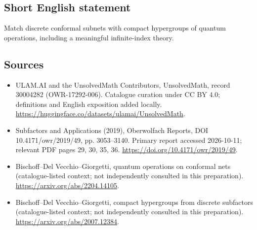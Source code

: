 \documentclass[11pt]{article}
\begin{document}
\subsection{Short English statement}
Match discrete conformal subnets with compact hypergroups of quantum operations, including a meaningful infinite-index theory.
\subsection{Sources}
\begin{itemize}
\item[\hypertarget{source:30004282:1}{S1}] ULAM.AI and the UnsolvedMath Contributors, UnsolvedMath, record 30004282 (OWR-17292-006). Catalogue curation under CC BY 4.0; definitions and English exposition added locally.
\url{https://huggingface.co/datasets/ulamai/UnsolvedMath}.
\item[\hypertarget{source:30004282:2}{S2}] Subfactors and Applications (2019), Oberwolfach Reports, DOI 10.4171/owr/2019/49, pp. 3053--3140. Primary report accessed 2026-10-11; relevant PDF pages 29, 30, 35, 36.
\url{https://doi.org/10.4171/owr/2019/49}.
\item[\hypertarget{source:30004282:3}{S3}] Bischoff--Del Vecchio--Giorgetti, quantum operations on conformal nets (catalogue-listed context; not independently consulted in this preparation).
\url{https://arxiv.org/abs/2204.14105}.
\item[\hypertarget{source:30004282:4}{S4}] Bischoff--Del Vecchio--Giorgetti, compact hypergroups from discrete subfactors (catalogue-listed context; not independently consulted in this preparation).
\url{https://arxiv.org/abs/2007.12384}.
\end{itemize}
\label{end:30004282}
\end{document}
